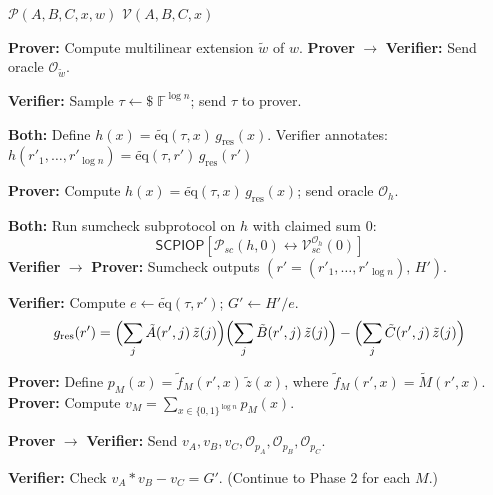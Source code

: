 \documentclass[11pt]{article}
\theoremstyle{plain}
\theoremstyle{definition}
\newcommand{\F}{\mathbb{F}}
\begin{document}
\begin{algorithm}[H]
\caption{Delphian PIOP -- First Phase}
\begin{algorithmic}[1]
\Statex \hspace{-\algorithmicindent}
  $\mathcal{P}(A, B, C, x, w)$
  \hfill
  $\mathcal{V}(A, B, C, x)$
\Statex \hrulefill

\State \textbf{Prover:} Compute multilinear extension $\tilde{w}$ of $w$.
\State \textbf{Prover} $\to$ \textbf{Verifier:} Send oracle $\mathcal{O}_{\tilde{w}}$.

\Statex
\State \textbf{Verifier:} Sample $\tau \leftarrow \$ \; \F^{\log n}$; send $\tau$ to prover.

\Statex
\State \textbf{Both:} Define $h(x) = \widetilde{\mathrm{eq}}(\tau, x)\, g_{\mathrm{res}}(x)$.
  \Statex \quad\quad Verifier annotates: $h(r'_1, \ldots, r'_{\log n}) = \widetilde{\mathrm{eq}}(\tau, r')\, g_{\mathrm{res}}(r')$

\State \textbf{Prover:} Compute $h(x) = \widetilde{\mathrm{eq}}(\tau, x)\, g_{\mathrm{res}}(x)$; send oracle $\mathcal{O}_h$.

\Statex
\State \textbf{Both:} Run sumcheck subprotocol on $h$ with claimed sum 0:
  \[
    \mathsf{SCPIOP}\!\left[\mathcal{P}_{sc}(h, 0) \leftrightarrow \mathcal{V}_{sc}^{\mathcal{O}_h}(0)\right]
  \]
\State \textbf{Verifier} $\to$ \textbf{Prover:} Sumcheck outputs $(r' = (r'_1, \ldots, r'_{\log n}),\, H')$.

\Statex
\State \textbf{Verifier:} Compute $e \leftarrow \widetilde{\mathrm{eq}}(\tau, r')$;\;
  $G' \leftarrow H'/e$.
  \Statex \quad{}
  \[
    g_{\mathrm{res}}(r') = \Bigl(\sum_j \tilde{A}(r',j)\,\tilde{z}(j)\Bigr)
      \Bigl(\sum_j \tilde{B}(r',j)\,\tilde{z}(j)\Bigr)
      - \Bigl(\sum_j \tilde{C}(r',j)\,\tilde{z}(j)\Bigr)
  \]

\Statex
{}
  \State \textbf{Prover:} Define $p_M(x) = \tilde{f}_M(r', x)\, \tilde{z}(x)$,
    where $\tilde{f}_M(r', x) = \tilde{M}(r', x)$.
  \State \textbf{Prover:} Compute $v_M = \sum_{x \in \{0,1\}^{\log n}} p_M(x)$.
\EndFor

\State \textbf{Prover} $\to$ \textbf{Verifier:} Send $v_A, v_B, v_C, \mathcal{O}_{p_A}, \mathcal{O}_{p_B}, \mathcal{O}_{p_C}$.

\State \textbf{Verifier:} Check $v_A * v_B - v_C = G'$.
  \Statex \quad\quad (Continue to Phase 2 for each $M$.)

\end{algorithmic}
\end{algorithm}
\end{document}
